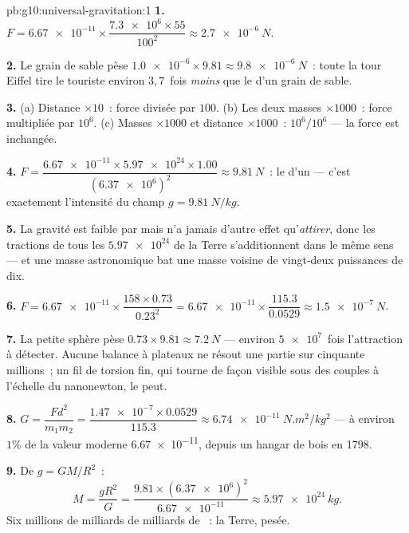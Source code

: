 \begin{solution}{pb:g10:universal-gravitation:1}
\textbf{1.} $F = \num{6.67e-11} \times
\dfrac{\num{7.3e6} \times 55}{100^2} \approx \qty{2.7e-6}{N}$.

\textbf{2.} Le grain de sable pèse
$\num{1.0e-6} \times 9.81 \approx \qty{9.8e-6}{N}$~: toute la tour
Eiffel tire le touriste environ $3{,}7$~fois \emph{moins} que le
 d'un grain de sable.

\textbf{3.} (a) Distance $\times 10$~: force divisée par $100$.
(b) Les deux masses $\times 1000$~: force multipliée par $10^6$.
(c) Masses $\times 1000$ et distance $\times 1000$~:
$10^6 / 10^6$ --- la force est inchangée.

\textbf{4.} $F = \dfrac{\num{6.67e-11} \times \num{5.97e24} \times
1.00}{(\num{6.37e6})^2} \approx \qty{9.81}{N}$~: le
 d'un  --- c'est exactement
l'intensité du champ $g = \qty{9.81}{N/kg}$.

\textbf{5.} La gravité est faible par  mais n'a
jamais d'autre effet qu'\emph{attirer}, donc les tractions de tous
les $\num{5.97e24}$  de la Terre s'additionnent
dans le même sens --- et une masse astronomique bat une masse
voisine de vingt-deux puissances de dix.

\textbf{6.} $F = \num{6.67e-11} \times \dfrac{158 \times 0.73}{0.23^2}
= \num{6.67e-11} \times \dfrac{115.3}{0.0529}
\approx \qty{1.5e-7}{N}$.

\textbf{7.} La petite sphère pèse
$0.73 \times 9.81 \approx \qty{7.2}{N}$ --- environ $\num{5e7}$~fois
l'attraction à détecter. Aucune balance à plateaux ne résout une
partie sur cinquante millions~; un fil de torsion fin, qui tourne de
façon visible sous des couples à l'échelle du nanonewton, le peut.

\textbf{8.} $G = \dfrac{F d^2}{m_1 m_2}
= \dfrac{\num{1.47e-7} \times 0.0529}{115.3}
\approx \qty{6.74e-11}{N.m^2/kg^2}$ --- à environ $1\%$ de la valeur
moderne \num{6.67e-11}, depuis un hangar de bois en 1798.

\textbf{9.} De $g = G M / R^2$~:
\[
M = \frac{g R^2}{G}
= \frac{9.81 \times (\num{6.37e6})^2}{\num{6.67e-11}}
\approx \qty{5.97e24}{kg}.
\]
Six millions de milliards de milliards de
~: la Terre, pesée.


\end{solution}

